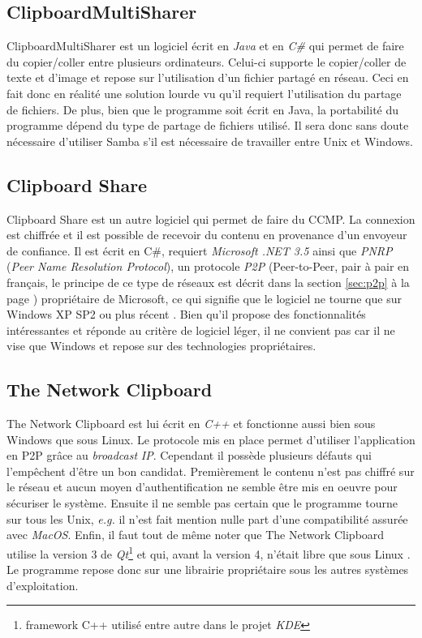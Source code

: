 \subsection{ClipboardMultiSharer}
ClipboardMultiSharer \cite{clipmsharer} est un logiciel écrit en \emph{Java}
et en \emph{C\#} qui permet de faire du copier/coller entre plusieurs
ordinateurs. Celui-ci supporte le copier/coller de texte et d'image et repose
sur l'utilisation d'un fichier partagé en réseau. Ceci en fait donc en réalité
une solution lourde vu qu'il requiert l'utilisation du partage de fichiers.
De plus, bien que le programme soit écrit en Java, la portabilité du programme
dépend du type de partage de fichiers utilisé. Il sera donc sans doute
nécessaire d'utiliser Samba s'il est nécessaire de travailler entre Unix
et Windows.

\subsection{Clipboard Share}
Clipboard Share \cite{clipshare} est un autre logiciel qui permet de faire
du CCMP. La connexion est chiffrée et il est possible de recevoir
du contenu en provenance d'un envoyeur de confiance. Il est écrit en C\#,
requiert \emph{Microsoft .NET 3.5} ainsi que \emph{PNRP} (\emph{Peer Name
Resolution Protocol}), un protocole \emph{P2P} (Peer-to-Peer, pair à pair en
français, le principe de ce type de réseaux est décrit dans la section
\ref{sec:p2p} à la page \pageref{sec:p2p}) propriétaire de Microsoft,
ce qui signifie que le logiciel ne tourne que sur Windows XP SP2 ou plus
récent \cite{wiki:pnrp}. Bien qu'il propose des fonctionnalités intéressantes
et réponde au critère de logiciel léger, il ne convient pas car il ne vise
que Windows et repose sur des technologies propriétaires.

\subsection{The Network Clipboard}
The Network Clipboard \cite{netclip} est lui écrit en \emph{C++} et fonctionne
aussi bien sous Windows que sous Linux. Le protocole mis en place permet
d'utiliser l'application en P2P grâce au \emph{broadcast} \emph{IP}.
Cependant il possède plusieurs défauts qui l'empêchent d'être un bon candidat.
Premièrement le contenu n'est pas chiffré sur le réseau et aucun moyen
d'authentification ne semble être mis en oeuvre pour sécuriser le système.
Ensuite il ne semble pas certain que le programme tourne sur tous les Unix,
\emph{e.g.} il n'est fait mention nulle part d'une compatibilité assurée
avec \emph{MacOS}. Enfin, il faut tout de même noter que The Network
Clipboard utilise la version 3 de \emph{Qt}\footnote{framework C++ utilisé
entre autre dans le projet \emph{KDE}} et qui, avant la version 4, n'était
libre que sous Linux \cite{wiki:qt}.
Le programme repose donc sur une librairie propriétaire sous les autres
systèmes d'exploitation.

